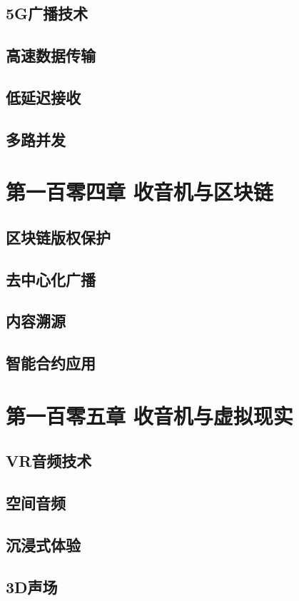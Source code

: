 \documentclass[12pt,UTF8]{ctexbook}
\begin{document}
\section{5G广播技术}
\section{高速数据传输}
\section{低延迟接收}
\section{多路并发}

\chapter{第一百零四章 收音机与区块链}

\section{区块链版权保护}
\section{去中心化广播}
\section{内容溯源}
\section{智能合约应用}

\chapter{第一百零五章 收音机与虚拟现实}

\section{VR音频技术}
\section{空间音频}
\section{沉浸式体验}
\section{3D声场}
\end{document}
